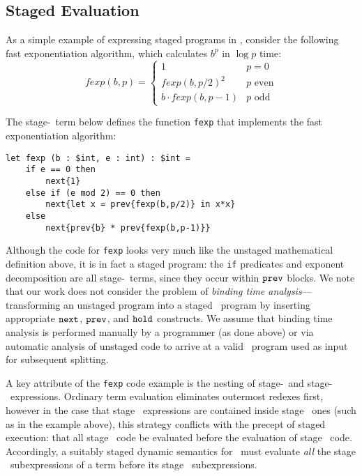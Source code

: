 \subsection{Staged Evaluation}

As a simple example of expressing staged programs in \lang, consider the following fast exponentiation algorithm, which 
calculates $b^p$ in $\log p$ time:
\[
	\mathit{fexp}(b,p) = \left \{ \begin{array}{ll} 
		1 &  p = 0 \\ 
		\mathit{fexp}(b,p/2)^2 & p \text{ even} \\ 
		b \cdot \mathit{fexp}(b,p-1) & p \text{ odd} \end{array}
	\right .
\]

\noindent
The stage-\bbone\ term below defines the function {\tt fexp} that implements the fast exponentiation algorithm:%

\begin{lstlisting} 
let fexp (b : $int, e : int) : $int =
	if e == 0 then
		next{1}
	else if (e mod 2) == 0 then
		next{let x = prev{fexp(b,p/2)} in x*x}
	else
		next{prev{b} * prev{fexp(b,p-1)}}		
\end{lstlisting}

Although the code for {\tt fexp} looks very much like the unstaged mathematical
definition above, it is in fact a staged program: the {\tt if} predicates and exponent
decomposition are all stage-\bbone\ terms, since they occur within ${\tt prev}$ blocks.
We note that our work does not consider the problem of {\em binding time analysis}---transforming an unstaged program into a staged \lang\ program by inserting appropriate ${\tt next}$, ${\tt prev}$, and ${\tt hold}$ constructs. We assume that binding time analysis is performed manually by a programmer (as done above) or via automatic analysis of unstaged code to arrive at a valid \lang\ program used as input for subsequent splitting.

A key attribute of the {\tt fexp} code example is the nesting of stage-\bbone\ and stage-\bbtwo\ expressions. Ordinary term evaluation eliminates outermost redexes first, 
however in the case that stage \bbone\ expressions are contained inside
stage \bbtwo\ ones (such as in the example above), this strategy conflicts with the precept of staged execution: that all stage \bbone\ code be evaluated before the evaluation of stage \bbtwo\ code. 
Accordingly, a suitably staged dynamic semantics for \lang\ must evaluate
\emph{all} the stage \bbone\ subexpressions of a term before its stage
\bbtwo\ subexpressions.

